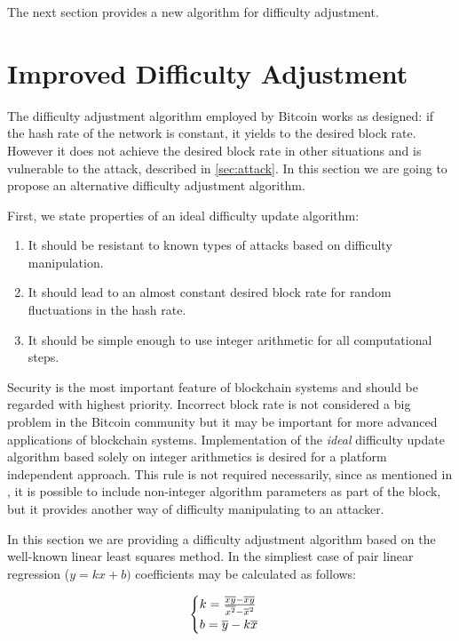 \documentclass[]{llncs}
\begin{document}
The next section provides a new algorithm for difficulty adjustment.

\section{Improved Difficulty Adjustment}
\label{sec:improved}

The difficulty adjustment algorithm employed by Bitcoin works as designed: if the hash rate of the network is constant, it yields to the desired block rate. However it does not achieve the desired block rate in other situations and is vulnerable to the attack, described in \ref{sec:attack}.
In this section we are going to propose an alternative difficulty adjustment algorithm.

First, we state properties of an ideal difficulty update algorithm:
\begin{enumerate}
\item{It should be resistant to known types of attacks based on difficulty manipulation.}
\item{It should lead to an almost constant desired block rate for random fluctuations in the hash rate.}
\item{It should be simple enough to use integer arithmetic for all computational steps.}
\end{enumerate}

Security is the most important feature of blockchain systems and should be regarded with highest priority.
Incorrect block rate is not considered a big problem in the Bitcoin community but it may be important for more advanced applications of blockchain systems.
Implementation of the \textit{ideal} difficulty update algorithm based solely on integer arithmetics is desired for a platform independent approach.
This rule is not required necessarily, since as mentioned in \cite{kraft2015difficulty}, it is possible to include non-integer algorithm parameters as part of the block, but it provides another way of difficulty manipulating to an attacker.

In this section we are providing a  difficulty adjustment algorithm based on the well-known linear least squares method\cite{lawson1974solving}. In the simpliest case of pair linear regression (\(y=kx+b)\) coefficients may be calculated as follows:

\begin{equation}
  \begin{cases}
    k= {{\overline{xy} - \overline{x} \overline{y}} \over {\overline{x^2} - \overline{x}^2}}  \\
    b= \overline{y}-k\overline{x}
  \end{cases}
\end{equation}
\end{document}
